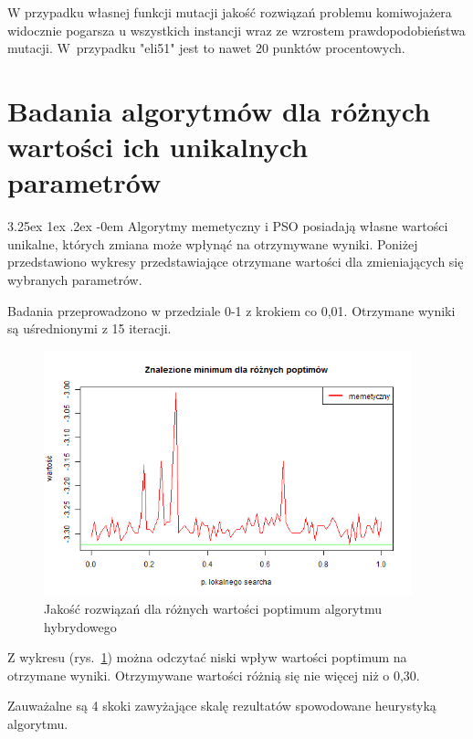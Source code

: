 \documentclass[11pt, a4paper]{article}
\makeatletter
\newcommand{\fbi}{\leavevmode{\parindent=1em\indent}}
\renewcommand\paragraph{\@startsection{paragraph}{5}{\z@}
  {3.25ex \@plus1ex \@minus.2ex}
  {-0em}
  {\normalfont\normalsize\bfseries}}
\makeatother
\begin{document}
\fbi
W przypadku własnej funkcji mutacji jakość rozwiązań problemu komiwojażera widocznie pogarsza u wszystkich instancji wraz ze wzrostem prawdopodobieństwa mutacji. W~przypadku "eli51" jest to nawet 20 punktów procentowych.


\newpage
\section{Badania algorytmów dla różnych wartości ich unikalnych parametrów}
\paragraph{}
Algorytmy memetyczny i PSO posiadają własne wartości unikalne, których zmiana może wpłynąć na otrzymywane wyniki. Poniżej przedstawiono wykresy przedstawiające otrzymane wartości dla zmieniających się wybranych parametrów.

\fbi
Badania przeprowadzono w przedziale 0-1 z krokiem co 0,01. Otrzymane wyniki są uśrednionymi z 15 iteracji.

\begin{figure}[H]
	\centering
	\includegraphics[width=0.95\textwidth]{./assets/Hartman6poptim.png}
	\caption{Jakość rozwiązań dla różnych wartości poptimum algorytmu hybrydowego}
	\label{fig:hybridpoptimum}
\end{figure}

\fbi
Z wykresu (rys.~\ref{fig:hybridpoptimum}) można odczytać niski wpływ wartości poptimum na otrzymane wyniki. Otrzymywane wartości różnią się nie więcej niż o 0,30. 

\fbi
Zauważalne są 4 skoki zawyżające skalę rezultatów spowodowane heurystyką algorytmu.
\end{document}
